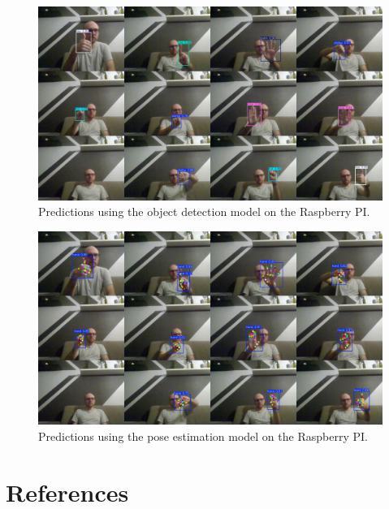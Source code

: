 \documentclass[12pt]{article}
\begin{document}
\begin{figure}[H]
  \centering
  \includegraphics[width=\textwidth]{./pictures/smallhands_rpi.jpg}
  \caption{Predictions using the object detection model on the Raspberry PI.}
  \label{fig:objrpi}
\end{figure}

\begin{figure}[H]
  \centering
  \includegraphics[width=\textwidth]{./pictures/pose_rpi.jpg}
  \caption{Predictions using the pose estimation model on the Raspberry PI.}
  \label{fig:poserpi}
\end{figure}

\section{References}


\end{document}
